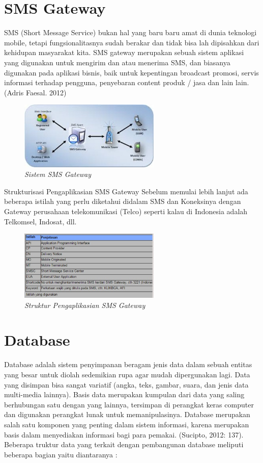 \documentclass{jtetiproposalskripsi}
\begin{document}
\section{SMS Gateway}
SMS (Short Message Service) bukan hal yang baru baru amat di dunia teknologi mobile, tetapi fungsionalitasnya sudah berakar dan tidak bisa lah dipisahkan dari kehidupan masyarakat kita. SMS gateway merupakan sebuah sistem aplikasi yang digunakan untuk mengirim dan atau menerima SMS, dan biasanya digunakan pada aplikasi bisnis, baik untuk kepentingan broadcast promosi, servis informasi terhadap pengguna, penyebaran content produk / jasa dan lain lain. (Adris Faesal. 2012)
\begin{figure}[ht!]
\centering
\includegraphics[width=0.6\textwidth]{gambar/sms_gateway}
\caption{\textit{Sistem SMS Gateway}}
\label{wsn}
\end{figure}
\newpage

Strukturisasi Pengaplikasian SMS Gateway Sebelum memulai lebih lanjut ada beberapa istilah yang perlu diketahui didalam SMS dan Koneksinya dengan Gateway perusahaan telekomunikasi (Telco) seperti kalau di Indonesia adalah Telkomsel, Indosat, dll.
\begin{figure}[ht!]
\centering
\includegraphics[width=0.6\textwidth]{gambar/Pengaplikasian_Gateway}
\caption{\textit{Struktur Pengaplikasian SMS Gateway}}
\label{wsn}
\end{figure}
\newpage

\section{Database}
Database adalah sistem penyimpanan beragam jenis data dalam sebuah entitas yang besar untuk diolah sedemikian rupa agar mudah dipergunakan lagi. Data yang disimpan bisa sangat variatif (angka, teks, gambar, suara, dan jenis data multi-media lainnya). Basis data merupakan kumpulan dari data yang saling berhubungan satu dengan yang lainnya, tersimpan di perangkat keras computer dan digunakan perangkat lunak untuk memanipulasinya. Database merupakan salah satu komponen yang penting dalam sistem informasi, karena merupakan basis dalam menyediakan informasi bagi para pemakai. (Sucipto, 2012: 137). Beberapa truktur data yang terkait dengan pembangunan database meliputi beberapa bagian yaitu diantaranya :
\end{document}
